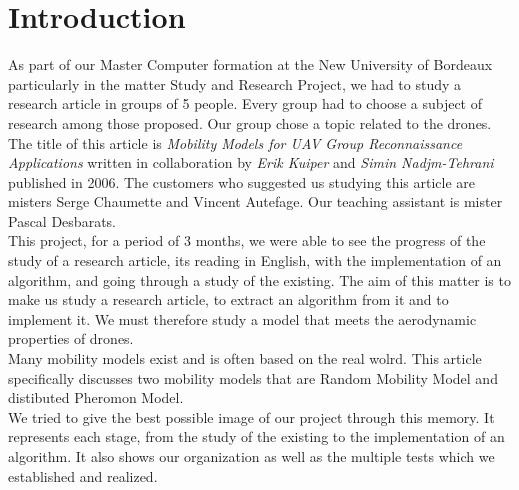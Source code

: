 \chapter*{Introduction}

As part of our Master Computer formation at the New University of Bordeaux particularly in the matter Study and Research Project, we had to study a research article in groups of 5 people. Every group had to choose a subject of research among those proposed. Our group chose a topic related to the drones. The title of this article is \textit{Mobility Models for UAV Group Reconnaissance Applications} written in collaboration by \textit{Erik Kuiper} and \textit{Simin Nadjm-Tehrani} published in 2006. The customers who suggested us studying this article are misters Serge Chaumette and Vincent Autefage. Our teaching assistant is mister Pascal Desbarats.\\

This project, for a period of 3 months, we were able to see the progress of the study of a research article, its reading in English, with the implementation of an algorithm, and going through a study of the existing.
The aim of this matter is to make us study a research article, to extract an algorithm from it and to implement it.
We must therefore study a model that meets the aerodynamic properties of drones.\\

Many mobility models exist and is often based on the real wolrd.
This article specifically discusses two mobility models that are Random Mobility Model and distibuted Pheromon Model.\\

We tried to give the best possible image of our project through this memory. It represents each stage, from the study of the existing to the implementation of an algorithm. It also shows our organization as well as the multiple tests which we established and realized. 

